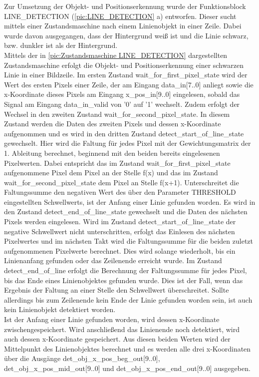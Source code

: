 \documentclass[ngerman,12pt]{article} %
\begin{document}
{Zur Umsetzung der Objekt- und Positionserkennung wurde der Funktionsblock LINE\_DETECTION (\autoref{pic:LINE_DETECTION} a) entworfen. Dieser sucht mittels einer Zustandsmaschine nach einem Linienobjekt in einer Zeile. Dabei wurde davon ausgegangen, dass der Hintergrund weiß ist und die Linie schwarz, bzw. dunkler ist als der Hintergrund.\\
Mittels der in \autoref{pic:Zustandsmaschine LINE_DETECTION} dargestellten Zustandsmaschine erfolgt die Objekt- und Positionserkennung einer schwarzen Linie in einer Bildzeile. Im ersten Zustand wait\_for\_first\_pixel\_state wird der Wert des ersten Pixels einer Zeile, der am Eingang data\_in[7..0] anliegt sowie die x-Koordinate dieses Pixels am Eingang x\_pos\_in[9..0] eingelesen, sobald das Signal am Eingang data\_in\_valid von '0' auf '1' wechselt. Zudem erfolgt der Wechsel in den zweiten Zustand wait\_for\_second\_pixel\_state. In diesem Zustand werden die Daten des zweiten Pixels und dessen x-Koordinate aufgenommen und es wird in den dritten Zustand detect\_start\_of\_line\_state gewechselt. Hier wird die Faltung für jedes Pixel mit der Gewichtungsmatrix der 1. Ableitung berechnet, beginnend mit den beiden bereits eingelesenen Pixelwerten. Dabei entspricht das im Zustand wait\_for\_first\_pixel\_state aufgenommene Pixel dem Pixel an der Stelle f(x) und das im Zustand wait\_for\_second\_pixel\_state dem Pixel an Stelle f(x+1). Unterschreitet die Faltungssumme den negativen Wert des über den Parameter THRESHOLD eingestellten Schwellwerts, ist der Anfang einer Linie gefunden worden. Es wird in den Zustand detect\_end\_of\_line\_state gewechselt und die Daten des nächsten Pixels werden eingelesen. Wird im Zustand detect\_start\_of\_line\_state der negative Schwellwert nicht unterschritten, erfolgt das Einlesen des nächsten Pixelwertes und im nächsten Takt wird die Faltungssumme für die beiden zuletzt aufgenommenen Pixelwerte berechnet. Dies wird solange wiederholt, bis ein Linienanfang gefunden oder das Zeilenende erreicht wurde. Im Zustand detect\_end\_of\_line erfolgt die Berechnung der Faltungssumme für jedes Pixel, bis das Ende eines Linienobjektes gefunden wurde. Dies ist der Fall, wenn das Ergebnis der Faltung an einer Stelle den Schwellwert überschreitet. Sollte allerdings bis zum Zeilenende kein Ende der Linie gefunden worden sein, ist auch kein Linienobjekt detektiert worden.\\
Ist der Anfang einer Linie gefunden worden, wird dessen x-Koordinate zwischengespeichert. Wird anschließend das Linienende noch detektiert, wird auch dessen x-Koordinate gespeichert. Aus diesen beiden Werten wird der Mittelpunkt des Linienobjektes berechnet und es werden alle drei x-Koordinaten über die Ausgänge det\_obj\_x\_pos\_beg\_out[9..0], det\_obj\_x\_pos\_mid\_out[9..0] und det\_obj\_x\_pos\_end\_out[9..0] ausgegeben.\newline

}
\end{document}
